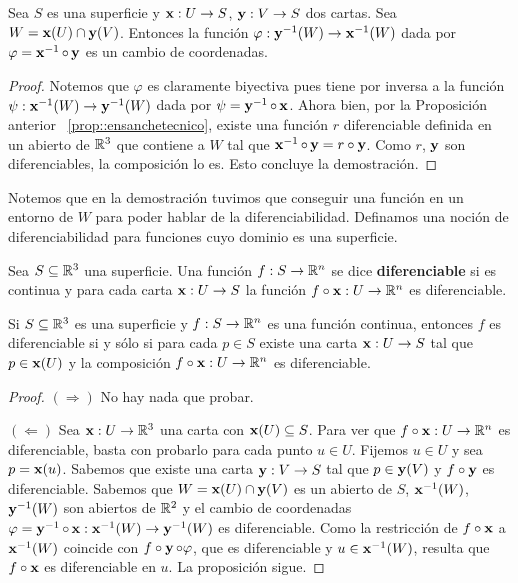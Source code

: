 \begin{prop}
Sea $S$ es una superficie y $\operatorname{\mathbf{x}}:U\to S$, $\operatorname{\mathbf{y}}:V\to S$ dos cartas. Sea $W=\operatorname{\mathbf{x}}(U)\cap\operatorname{\mathbf{y}}(V)$. Entonces la función $\varphi:\operatorname{\mathbf{y}}^{-1}(W)\to\operatorname{\mathbf{x}}^{-1}(W)$ dada por $\varphi=\operatorname{\mathbf{x}}^{-1}\circ\operatorname{\mathbf{y}}$ es un cambio de coordenadas.
\begin{proof}
Notemos que $\varphi$ es claramente biyectiva pues tiene por inversa a la función $\psi:\operatorname{\mathbf{x}}^{-1}(W)\to\operatorname{\mathbf{y}}^{-1}(W)$ dada por $\psi=\operatorname{\mathbf{y}}^{-1}\circ\operatorname{\mathbf{x}}$. Ahora bien, por la Proposición anterior ~\ref{prop::ensanchetecnico}, existe una función $r$ diferenciable definida en un abierto de $\mathbb{R}^3$ que contiene a $W$ tal que $\operatorname{\mathbf{x}}^{-1}\circ\operatorname{\mathbf{y}} = r\circ\operatorname{\mathbf{y}}$. Como $r$, $\operatorname{\mathbf{y}}$ son diferenciables, la composición lo es. Esto concluye la demostración.
\end{proof}
\end{prop}

Notemos que en la demostración tuvimos que conseguir una función en un entorno de $W$ para poder hablar de la diferenciabilidad. Definamos una noción de diferenciabilidad para funciones cuyo dominio es una superficie.

\begin{defn}
Sea $S\subseteq\mathbb{R}^3$ una superficie. Una función $f:S\to\mathbb{R}^n$ se dice \textbf{diferenciable} si es continua y para cada carta $\operatorname{\mathbf{x}}:U\to S$ la función $f\circ\operatorname{\mathbf{x}}:U\to\mathbb{R}^n$ es diferenciable.
\end{defn}

\begin{prop}\label{prop::diferenciabilidadcartas}
Si $S\subseteq\mathbb{R}^3$ es una superficie y $f:S\to\mathbb{R}^n$ es una función continua, entonces $f$ es diferenciable si y sólo si para cada $p\in S$ existe una carta $\operatorname{\mathbf{x}}:U\to S$ tal que $p\in\operatorname{\mathbf{x}}(U)$ y la composición $f\circ\operatorname{\mathbf{x}}:U\to\mathbb{R}^n$ es diferenciable.
\begin{proof}
\hfill

$(\Longrightarrow)$ No hay nada que probar.

$(\Longleftarrow)$ Sea $\operatorname{\mathbf{x}}:U\to\mathbb{R}^3$ una carta con $\operatorname{\mathbf{x}}(U)\subseteq S$. Para ver que $f\circ\operatorname{\mathbf{x}}:U\to\mathbb{R}^n$ es diferenciable, basta con probarlo para cada punto $u\in U$. Fijemos $u\in U$ y sea $p=\operatorname{\mathbf{x}}(u)$. Sabemos que existe una carta $\operatorname{\mathbf{y}}:V\to S$ tal que $p\in\operatorname{\mathbf{y}}(V)$ y $f\circ\operatorname{\mathbf{y}}$ es diferenciable. Sabemos que $W=\operatorname{\mathbf{x}}(U)\cap\operatorname{\mathbf{y}}(V)$ es un abierto de $S$, $\operatorname{\mathbf{x}}^{-1}(W)$, $\operatorname{\mathbf{y}}^{-1}(W)$ son abiertos de $\mathbb{R}^2$ y el cambio de coordenadas $\varphi = \operatorname{\mathbf{y}}^{-1}\circ\operatorname{\mathbf{x}} : \operatorname{\mathbf{x}}^{-1}(W)\to\operatorname{\mathbf{y}}^{-1}(W)$ es diferenciable. Como la restricción de $f\circ\operatorname{\mathbf{x}}$ a $\operatorname{\mathbf{x}}^{-1}(W)$ coincide con $f\circ\operatorname{\mathbf{y}}\circ\varphi$, que es diferenciable y $u\in\operatorname{\mathbf{x}}^{-1}(W)$, resulta que $f\circ\operatorname{\mathbf{x}}$ es diferenciable en $u$. La proposición sigue.
\end{proof}
\end{prop}

